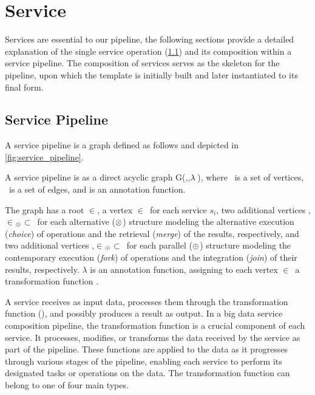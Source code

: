 \section{Service}
Services are essential to our pipeline, the following sections provide a detailed explanation of the single service operation (\cref{sec:service_definition})  and its composition within a service pipeline.
The composition of services serves as the skeleton for the pipeline, upon which the template is initially built and later instantiated to its final form.

\subsection{Service Pipeline}\label{sec:service_definition}
A service pipeline is a graph defined as follows and depicted in \cref{fig:service_pipeline}.
\begin{definition} \label{def:service_flow}
  A service pipeline is as a direct acyclic graph G(\V,\E,$\lambda\,{}$), where \V\ is a set of vertices, \E\ is a set of edges, and \myLambda is an annotation function.

  The graph has a root $\in$\V, a vertex $\in$\V\ for each service $s_i$,
  two additional vertices ,$\in$\V$_{\otimes}$$\subset$\V\ for each alternative ($\otimes$) structure modeling the alternative execution (\emph{choice}) of operations and the retrieval (\emph{merge}) of the results,
        respectively, and two additional vertices ,$\in$\V$_{\oplus}$$\subset$\V\ for each parallel ($\oplus$) structure modeling the contemporary execution (\emph{fork}) of operations and the integration (\emph{join}) of their results, respectively.
    $\lambda$ is an annotation function, assigning to each vertex $\in$\V\ a transformation function \F.
\end{definition}
A service receives as input data, processes them through the transformation function (\F{}), and possibly produces a result as output.
In a big data service composition pipeline, the transformation function is a crucial component of each service.
It processes, modifies, or transforms the data received by the service as part of the pipeline.
These functions are applied to the data as it progresses through various stages of the pipeline, enabling each service to perform its designated tasks or operations on the data.
The transformation function can belong to one of four main types.
